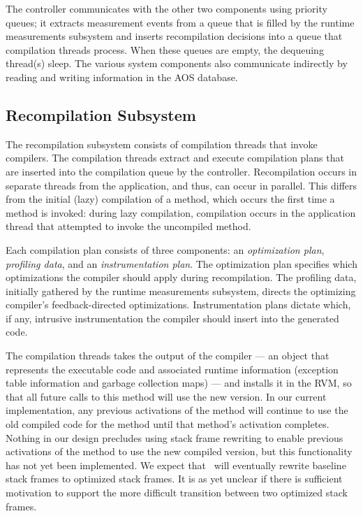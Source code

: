 The controller communicates with the other two components using
priority queues; it extracts measurement events from a queue that is
filled by the runtime measurements subsystem and inserts recompilation
decisions into a queue that compilation threads process.  When
these queues are empty, the dequeuing thread(s) sleep.  The various
system components also communicate 
indirectly by reading and writing information in the AOS database.

\subsection{Recompilation Subsystem}\label{sec:arch:comp}
The recompilation subsystem consists of compilation threads that
invoke compilers.
The compilation threads extract and execute compilation plans
that are inserted into the compilation queue by the controller. 
Recompilation occurs in separate threads from the application, and thus, 
can occur in parallel. 
This differs from the initial (lazy) compilation of a method, 
which occurs the first time a method is invoked:
during lazy compilation, compilation occurs in the application 
thread that attempted to invoke the uncompiled method.

Each compilation plan consists of three components: an {\em optimization
plan\/}, {\em profiling data\/}, and an {\em instrumentation plan\/}.
The optimization plan specifies which optimizations the compiler
should apply during recompilation.  
The profiling data, initially gathered by the runtime measurements subsystem, 
directs the optimizing compiler's feedback-directed optimizations.  
Instrumentation plans dictate which, if any, intrusive instrumentation the compiler 
should insert into the generated code. 

The compilation threads takes the output of the compiler --- an
object that represents the executable code and associated runtime
information (exception table information and garbage collection maps) ---
and installs it in the RVM, so that all future calls to this method
will use the new version.  In our current implementation, any previous
activations of the method will continue to use the old compiled
code for the method until that method's activation completes.  Nothing
in our design precludes using stack frame rewriting to enable previous
activations of the method to use the new compiled version, but this
functionality has not yet been implemented.  We expect that \jp\ will
eventually rewrite baseline stack frames to optimized stack frames. 
It is as yet unclear if there is sufficient motivation to support
the more difficult transition between two optimized stack frames. 



